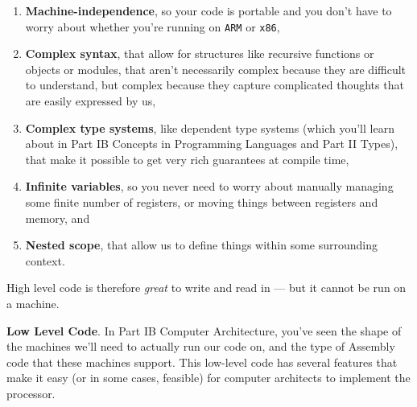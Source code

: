 \begin{enumerate}
    \item \textbf{Machine-independence}, so your code is portable and you don't have to worry about whether you're running on \texttt{ARM} or \texttt{x86},
    \item \textbf{Complex syntax}, that allow for structures like recursive functions or objects or modules, that aren't necessarily complex because they are difficult to understand, but complex because they capture complicated thoughts that are easily expressed by us,
    \item \textbf{Complex type systems}, like dependent type systems (which you'll learn about in {\sffamily Part IB Concepts in Programming Languages} and {\sffamily Part II Types}), that make it possible to get very rich guarantees at compile time,
    \item \textbf{Infinite variables}, so you never need to worry about manually managing some finite number of registers, or moving things between registers and memory, and
    \item \textbf{Nested scope}, that allow us to define things within some surrounding context.
\end{enumerate}

High level code is therefore \emph{great} to write and read in --- but it cannot be run on a machine. 

\textbf{Low Level Code}. In {\sffamily Part IB Computer Architecture}, you've seen the shape of the machines we'll need to actually run our code on, and the type of Assembly code that these machines support. This low-level code has several features that make it easy (or in some cases, feasible) for computer architects to implement the processor.

